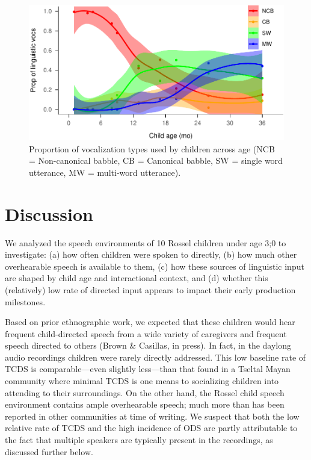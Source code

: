 \documentclass[,man,mask,floatsintext]{apa6}
\begin{document}
\begin{figure}
\centering
\includegraphics{Yeli-CLE_files/figure-latex/fig4-1.pdf}
\caption{\label{fig:fig4}Proportion of vocalization types used by children
across age (NCB = Non-canonical babble, CB = Canonical babble, SW =
single word utterance, MW = multi-word utterance).}
\end{figure}

\section{Discussion}\label{disc}

We analyzed the speech environments of 10 Rossel children under age 3;0
to investigate: (a) how often children were spoken to directly, (b) how
much other overhearable speech is available to them, (c) how these
sources of linguistic input are shaped by child age and interactional
context, and (d) whether this (relatively) low rate of directed input
appears to impact their early production milestones.

Based on prior ethnographic work, we expected that these children would
hear frequent child-directed speech from a wide variety of caregivers
and frequent speech directed to others (Brown \& Casillas, in press). In
fact, in the daylong audio recordings children were rarely directly
addressed. This low baseline rate of TCDS is comparable---even slightly
less---than that found in a Tseltal Mayan community where minimal TCDS
is one means to socializing children into attending to their
surroundings. On the other hand, the Rossel child speech environment
contains ample overhearable speech; much more than has been reported in
other communities at time of writing. We suspect that both the low
relative rate of TCDS and the high incidence of ODS are partly
attributable to the fact that multiple speakers are typically present in
the recordings, as discussed further below.
\end{document}
